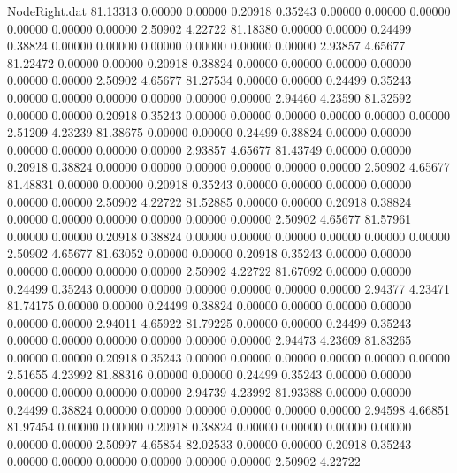 \begin{filecontents}{NodeRight.dat}
  81.13313    0.00000    0.00000     0.20918    0.35243    0.00000    0.00000    0.00000    0.00000    0.00000    0.00000    2.50902    4.22722
  81.18380    0.00000    0.00000     0.24499    0.38824    0.00000    0.00000    0.00000    0.00000    0.00000    0.00000    2.93857    4.65677
  81.22472    0.00000    0.00000     0.20918    0.38824    0.00000    0.00000    0.00000    0.00000    0.00000    0.00000    2.50902    4.65677
  81.27534    0.00000    0.00000     0.24499    0.35243    0.00000    0.00000    0.00000    0.00000    0.00000    0.00000    2.94460    4.23590
  81.32592    0.00000    0.00000     0.20918    0.35243    0.00000    0.00000    0.00000    0.00000    0.00000    0.00000    2.51209    4.23239
  81.38675    0.00000    0.00000     0.24499    0.38824    0.00000    0.00000    0.00000    0.00000    0.00000    0.00000    2.93857    4.65677
  81.43749    0.00000    0.00000     0.20918    0.38824    0.00000    0.00000    0.00000    0.00000    0.00000    0.00000    2.50902    4.65677
  81.48831    0.00000    0.00000     0.20918    0.35243    0.00000    0.00000    0.00000    0.00000    0.00000    0.00000    2.50902    4.22722
  81.52885    0.00000    0.00000     0.20918    0.38824    0.00000    0.00000    0.00000    0.00000    0.00000    0.00000    2.50902    4.65677
  81.57961    0.00000    0.00000     0.20918    0.38824    0.00000    0.00000    0.00000    0.00000    0.00000    0.00000    2.50902    4.65677
  81.63052    0.00000    0.00000     0.20918    0.35243    0.00000    0.00000    0.00000    0.00000    0.00000    0.00000    2.50902    4.22722
  81.67092    0.00000    0.00000     0.24499    0.35243    0.00000    0.00000    0.00000    0.00000    0.00000    0.00000    2.94377    4.23471
  81.74175    0.00000    0.00000     0.24499    0.38824    0.00000    0.00000    0.00000    0.00000    0.00000    0.00000    2.94011    4.65922
  81.79225    0.00000    0.00000     0.24499    0.35243    0.00000    0.00000    0.00000    0.00000    0.00000    0.00000    2.94473    4.23609
  81.83265    0.00000    0.00000     0.20918    0.35243    0.00000    0.00000    0.00000    0.00000    0.00000    0.00000    2.51655    4.23992
  81.88316    0.00000    0.00000     0.24499    0.35243    0.00000    0.00000    0.00000    0.00000    0.00000    0.00000    2.94739    4.23992
  81.93388    0.00000    0.00000     0.24499    0.38824    0.00000    0.00000    0.00000    0.00000    0.00000    0.00000    2.94598    4.66851
  81.97454    0.00000    0.00000     0.20918    0.38824    0.00000    0.00000    0.00000    0.00000    0.00000    0.00000    2.50997    4.65854
  82.02533    0.00000    0.00000     0.20918    0.35243    0.00000    0.00000    0.00000    0.00000    0.00000    0.00000    2.50902    4.22722

\end{filecontents}
